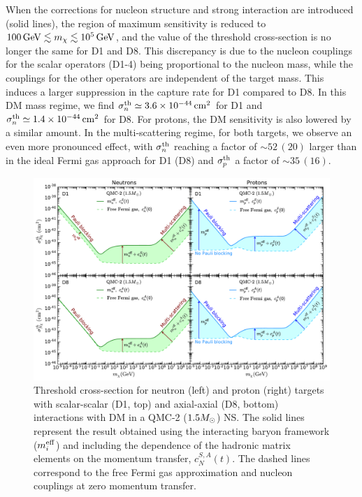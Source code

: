 When the corrections for nucleon structure and strong interaction are introduced (solid lines), the region of maximum sensitivity is reduced to $100{\rm \,GeV}\lesssim m_\chi\lesssim  10^5{\rm \,GeV}$, and the value of the threshold cross-section is no longer the same for D1 and D8. This discrepancy is due to the nucleon couplings for the scalar operators (D1-4) being proportional to the nucleon mass, while the couplings for the other operators are independent of the target mass. This induces a larger suppression in the capture rate for D1 compared to D8. In this DM mass regime, we find $\sigma^\mathrm{th}_n\simeq3.6\times10^{-44}{\rm \,cm}^2$ for D1 and $\sigma^\mathrm{th}_n\simeq1.4\times10^{-44}{\rm \,cm}^2$  for D8. For protons, the DM sensitivity is also lowered by a similar amount. In the multi-scattering regime, for both targets, we observe an even more pronounced effect, with $\sigma^\mathrm{th}_n$ reaching a factor of $\sim52 \,(20)$ larger than in the ideal Fermi gas approach for D1 (D8) and $\sigma^\mathrm{th}_p$ a factor of $\sim 35 \,(16)$. 

\begin{figure}[t!bp]
   \centering
\includegraphics[width=\textwidth]{capture_3/sigmath_N_D1_D8.pdf}
\caption[Threshold cross-section for neutron (left) and proton (right) targets with scalar-scalar (D1, top) and axial-axial (D8, bottom) interactions with DM in a QMC-2 ($1.5\Msun$) NS. ]{Threshold cross-section for neutron (left) and proton (right) targets with scalar-scalar (D1, top) and axial-axial (D8, bottom) interactions with DM in a QMC-2 ($1.5\Msun$) NS. 
The solid lines represent the result obtained using the interacting baryon framework ($m_i^{\rm eff}$) and including the dependence of the hadronic matrix elements on the momentum transfer, $c_N^{S,A}(t)$. The dashed lines correspond to the free Fermi gas approximation and nucleon couplings at zero momentum transfer. }
   \label{ch5:fig:sigmathcomp}
\end{figure}


